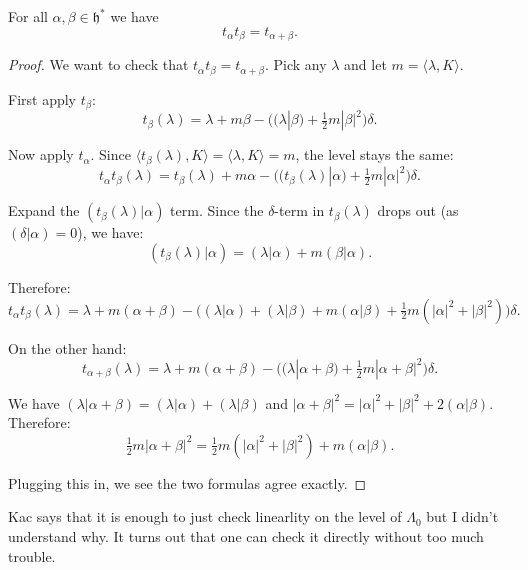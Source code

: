 \documentclass[12pt]{article}
\begin{document}
\begin{proposition}
For all $\alpha, \beta \in \mathfrak{h}^*$ we have
    \begin{equation}
    t_\alpha t_\beta = t_{\alpha+\beta}.
\end{equation}
\end{proposition}
\begin{proof}
    
    We want to check that $t_\alpha t_\beta = t_{\alpha+\beta}$. Pick any $\lambda$ and let $m = \langle\lambda,K\rangle$.

First apply $t_\beta$:
\[
    t_\beta(\lambda) = \lambda + m\beta - \Big((\lambda|\beta) + \tfrac12 m|\beta|^2\Big)\delta.
\]

Now apply $t_\alpha$. Since $\langle t_\beta(\lambda),K\rangle = \langle \lambda,K\rangle = m$, the level stays the same:
\[
    t_\alpha t_\beta(\lambda) = t_\beta(\lambda) + m\alpha - \Big((t_\beta(\lambda)|\alpha) + \tfrac12 m|\alpha|^2\Big)\delta.
\]

Expand the $(t_\beta(\lambda)|\alpha)$ term. Since the $\delta$-term in $t_\beta(\lambda)$ drops out (as $(\delta|\alpha)=0$), we have:
\[
    (t_\beta(\lambda)|\alpha) = (\lambda|\alpha) + m(\beta|\alpha).
\]

Therefore:
\[
    t_\alpha t_\beta(\lambda) = \lambda + m(\alpha+\beta) - \Big( (\lambda|\alpha) + (\lambda|\beta) + m(\alpha|\beta) + \tfrac12 m(|\alpha|^2+|\beta|^2)\Big)\delta.
\]

On the other hand:
\[
    t_{\alpha+\beta}(\lambda) = \lambda + m(\alpha+\beta) - \Big( (\lambda|\alpha+\beta) + \tfrac12 m|\alpha+\beta|^2\Big)\delta.
\]

We have $(\lambda|\alpha+\beta) = (\lambda|\alpha)+(\lambda|\beta)$ and $|\alpha+\beta|^2 = |\alpha|^2 + |\beta|^2 + 2(\alpha|\beta)$. Therefore:
\[
    \tfrac12 m|\alpha+\beta|^2 = \tfrac12 m(|\alpha|^2+|\beta|^2) + m(\alpha|\beta).
\]

Plugging this in, we see the two formulas agree exactly. \end{proof}
\begin{remark}
    Kac says that it is enough to just check linearlity on the level of $\Lambda_0$ but I didn't understand why. It turns out that one can check it directly without too much trouble.
\end{remark}
\end{document}
